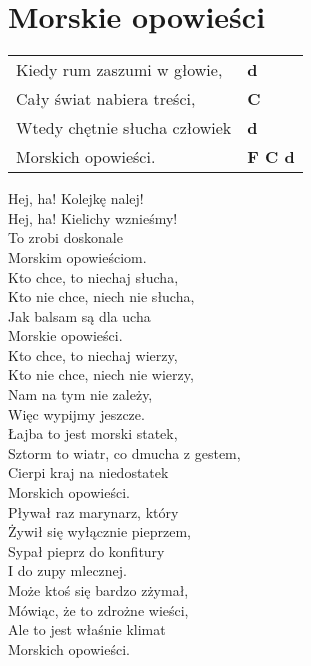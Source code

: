 \section{Morskie opowieści}

\vspace{2em}
\begin{tabular}{@{}p{9cm}@{}l@{}}
Kiedy rum zaszumi w głowie, & \bfseries  d \\
Cały świat nabiera treści, & \bfseries  C \\
Wtedy chętnie słucha człowiek & \bfseries  d \\
Morskich opowieści. & \bfseries  F C d \\
\end{tabular}

\begin{multicols}{2}
Hej, ha! Kolejkę nalej! \\
Hej, ha! Kielichy wznieśmy! \\
To zrobi doskonale \\
Morskim opowieściom. \\

Kto chce, to niechaj słucha, \\
Kto nie chce, niech nie słucha, \\
Jak balsam są dla ucha \\
Morskie opowieści. \\

Kto chce, to niechaj wierzy, \\
Kto nie chce, niech nie wierzy, \\
Nam na tym nie zależy, \\
Więc wypijmy jeszcze. \\

Łajba to jest morski statek, \\
Sztorm to wiatr, co dmucha z gestem, \\
Cierpi kraj na niedostatek \\
Morskich opowieści. \\

Pływał raz marynarz, który \\
Żywił się wyłącznie pieprzem, \\
Sypał pieprz do konfitury \\
I do zupy mlecznej. \\

Może ktoś się bardzo zżymał, \\
Mówiąc, że to zdrożne wieści, \\
Ale to jest właśnie klimat \\
Morskich opowieści. \\


\end{multicols}
